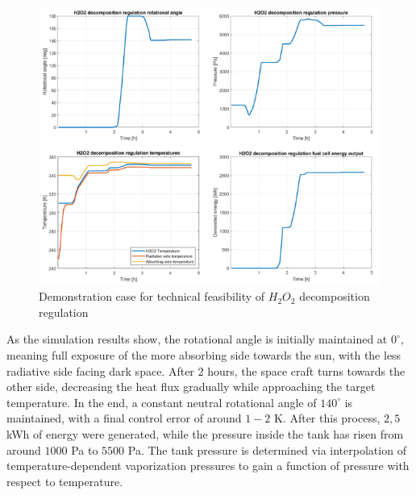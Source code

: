 \begin{figure}[H]
	\centering\includegraphics[width=\linewidth]{feasibility}
	\caption{Demonstration case for technical feasibility of $H_2O_2$ decomposition regulation}\label{fig6}
\end{figure}
As the simulation results show, the rotational angle is initially maintained at $0^\circ$, meaning full exposure of the more absorbing side towards the sun, with the less radiative side facing dark space. After $2$ hours, the space craft turns towards the other side, decreasing the heat flux gradually while approaching the target temperature. In the end, a constant neutral rotational angle of $140^\circ$ is maintained, with a final control error of around $1-2$ K. After this process, $2,5$ kWh of energy were generated, while the pressure inside the tank has risen from around $1000$ Pa to $5500$ Pa. The tank pressure is determined via interpolation of temperature-dependent vaporization pressures to gain a function of pressure with respect to temperature.